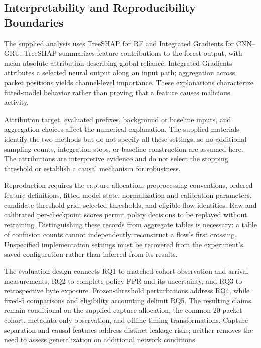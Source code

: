 \documentclass[conference]{IEEEtran}
\begin{document}
\subsection{Interpretability and Reproducibility Boundaries}
The supplied analysis uses TreeSHAP for RF and Integrated Gradients for CNN--GRU. TreeSHAP summarizes feature contributions to the forest output, with mean absolute attribution describing global reliance. Integrated Gradients attributes a selected neural output along an input path; aggregation across packet positions yields channel-level importance. These explanations characterize fitted-model behavior rather than proving that a feature causes malicious activity.

Attribution target, evaluated prefixes, background or baseline inputs, and aggregation choices affect the numerical explanation. The supplied materials identify the two methods but do not specify all these settings, so no additional sampling counts, integration steps, or baseline construction are assumed here. The attributions are interpretive evidence and do not select the stopping threshold or establish a causal mechanism for robustness.

Reproduction requires the capture allocation, preprocessing conventions, ordered feature definitions, fitted model state, normalization and calibration parameters, candidate threshold grid, selected thresholds, and eligible flow identities. Raw and calibrated per-checkpoint scores permit policy decisions to be replayed without retraining. Distinguishing these records from aggregate tables is necessary: a table of confusion counts cannot independently reconstruct a flow's first crossing. Unspecified implementation settings must be recovered from the experiment's saved configuration rather than inferred from its results.

The evaluation design connects RQ1 to matched-cohort observation and arrival measurements, RQ2 to complete-policy FPR and its uncertainty, and RQ3 to retrospective byte exposure. Frozen-threshold perturbations address RQ4, while fixed-5 comparisons and eligibility accounting delimit RQ5. The resulting claims remain conditional on the supplied capture allocation, the common 20-packet cohort, metadata-only observation, and offline timing transformations. Capture separation and causal features address distinct leakage risks; neither removes the need to assess generalization on additional network conditions.


\end{document}
